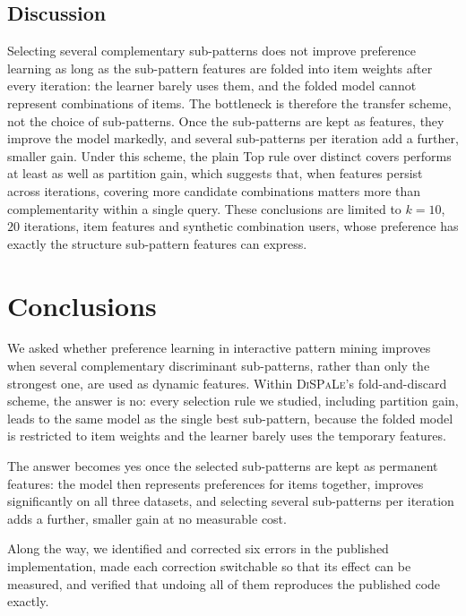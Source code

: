 \documentclass[sigconf]{acmart}
\begin{document}
\subsection{Discussion}
\label{subsec:discussion}

Selecting several complementary sub-patterns does not improve preference learning as long as the sub-pattern features are folded into item weights after every iteration: the learner barely uses them, and the folded model cannot represent combinations of items. The bottleneck is therefore the transfer scheme, not the choice of sub-patterns. Once the sub-patterns are kept as features, they improve the model markedly, and several sub-patterns per iteration add a further, smaller gain. Under this scheme, the plain Top rule over distinct covers performs at least as well as partition gain, which suggests that, when features persist across iterations, covering more candidate combinations matters more than complementarity within a single query. These conclusions are limited to $k = 10$, $20$ iterations, item features and synthetic combination users, whose preference has exactly the structure sub-pattern features can express.

\section{Conclusions}
\label{sec:conclusions}

We asked whether preference learning in interactive pattern mining improves when several complementary discriminant sub-patterns, rather than only the strongest one, are used as dynamic features. Within \textsc{DiSPaLe}'s fold-and-discard scheme, the answer is no: every selection rule we studied, including partition gain, leads to the same model as the single best sub-pattern, because the folded model is restricted to item weights and the learner barely uses the temporary features. 

The answer becomes yes once the selected sub-patterns are kept as permanent features: the model then represents preferences for items together, improves significantly on all three datasets, and selecting several sub-patterns per iteration adds a further, smaller gain at no measurable cost.

Along the way, we identified and corrected six errors in the published implementation, made each correction switchable so that its effect can be measured, and verified that undoing all of them reproduces the published code exactly.
\end{document}

